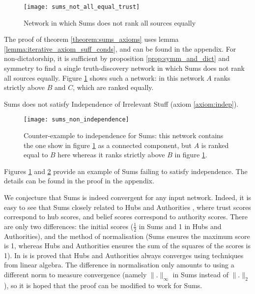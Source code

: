 \documentclass[../main.tex]{subfiles}
\begin{document}
\begin{figure}
    \centering
    \texttt{[image: sums\_not\_all\_equal\_trust]}
    \caption{Network in which Sums does not rank all sources equally}
    \label{img:sums_not_all_equal_trust}
\end{figure}

The proof of theorem \ref{theorem:sums_axioms} uses lemma
\ref{lemma:iterative_axiom_suff_conds}, and can be found in the appendix. For
non-dictatorship, it is sufficient by proposition \ref{prop:symm_and_dict} and
symmetry to find a single truth-discovery network in which Sums does not rank
all sources equally. Figure \ref{img:sums_not_all_equal_trust} shows such a
network: in this network $A$ ranks strictly above $B$ and $C$, which are ranked
equally.

\begin{theorem}
\label{theorem:sums_non_indep}
Sums does not satisfy Independence of Irrelevant Stuff (axiom
\ref{axiom:indep}).
\end{theorem}

\begin{figure}
    \centering
    \texttt{[image: sums\_non\_independence]}
    \caption{
        Counter-example to independence for Sums: this network contains the one
        show in figure \ref{img:sums_not_all_equal_trust} as a connected
        component, but $A$ is ranked equal to $B$ here whereas it ranks
        strictly above $B$ in figure \ref{img:sums_not_all_equal_trust}.
    }
    \label{img:sums_non_indep}
\end{figure}

Figures \ref{img:sums_not_all_equal_trust} and \ref{img:sums_non_indep}
provide an example of Sums failing to satisfy independence. The details can be
found in the proof in the appendix.

We conjecture that Sums is indeed convergent for any input network. Indeed, it
is easy to see that Sums closely related to Hubs and Authorities
\cite{kleinberg}, where trust scores correspond to hub scores, and belief
scores correspond to authority scores. There are only two differences: the
initial scores ($\frac{1}{2}$ in Sums and 1 in Hubs and Authorities), and the
method of normalisation (Sums ensures the maximum score is 1, whereas Hubs and
Authorities ensures the sum of the squares of the scores is 1). In
\cite{kleinberg} is is proved that Hubs and Authorities always converges using
techniques from linear algebra. The difference in normalisation only amounts to
using a different norm to measure convergence (namely $\|.\|_{\infty}$ in Sums
instead of $\|.\|_2$), so it is hoped that the proof can be modified to work
for Sums.
\end{document}
